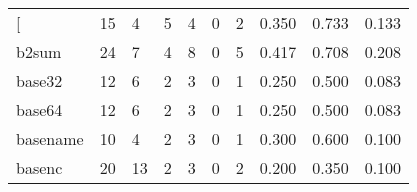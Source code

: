 \begin{longtable}{lp{2.0cm}p{2.0cm}p{2.0cm}p{2.0cm}p{2.0cm}p{2.0cm}p{2.0cm}p{2.0cm}p{2.0cm}}
\bottomrule
\endlastfoot
{[}         &                     15 &                                             4 &                                            5 &                                           4 &                                            0 &                                          2 &                                0.350 &                                  0.733 &                                0.133 \\
b2sum     &                     24 &                                             7 &                                            4 &                                           8 &                                            0 &                                          5 &                                0.417 &                                  0.708 &                                0.208 \\
base32    &                     12 &                                             6 &                                            2 &                                           3 &                                            0 &                                          1 &                                0.250 &                                  0.500 &                                0.083 \\
base64    &                     12 &                                             6 &                                            2 &                                           3 &                                            0 &                                          1 &                                0.250 &                                  0.500 &                                0.083 \\
basename  &                     10 &                                             4 &                                            2 &                                           3 &                                            0 &                                          1 &                                0.300 &                                  0.600 &                                0.100 \\
basenc    &                     20 &                                            13 &                                            2 &                                           3 &                                            0 &                                          2 &                                0.200 &                                  0.350 &                                0.100 \\

\end{longtable}

